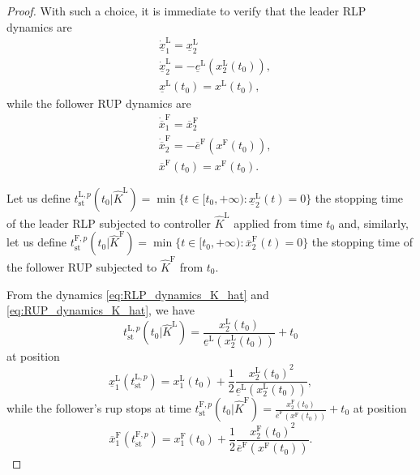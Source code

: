 \documentclass[letterpaper, 10 pt, conference]{ieeeconf}
\theoremstyle{definition}
\theoremstyle{nopoint}
\begin{document}
\begin{proof}
	With such a choice, it is immediate to verify that the  
	leader RLP dynamics are
	\begin{subequations}\label{eq:RLP_dynamics_K_hat}
		\begin{align}
			& \dot{\underline{x}}_1^\mathrm{L}=\underline{x}_2^\mathrm{L} \label{eq:RLP_dynamics_K_hat_dynamics}\\
			& \dot{\underline{x}}_2^\mathrm{L}=-\underline{e}^\mathrm{L}\left(x_2^\mathrm{L}(t_0)\right),\label{eq:RLP_dynamics_K_hat_constraints}\\
			& \underline{x}^\mathrm{L}(t_0)=x^\mathrm{L}(t_0), \label{eq:RLP_dynamics_K_hat_initial}
		\end{align}
	\end{subequations}
	while the follower RUP dynamics are
	\begin{subequations}\label{eq:RUP_dynamics_K_hat}
		\begin{align}
			& \dot{\overline{x}}_1^\mathrm{F}=\overline{x}_2^\mathrm{F} \label{eq:RUP_dynamics_K_hat_dynamics}\\
			& \dot{\overline{x}}_2^\mathrm{F}=-\overline{e}^\mathrm{F}\left(x^\mathrm{F}(t_0)\right),\label{eq:RUP_dynamics_K_hat_constraints}\\
			& \overline{x}^\mathrm{F}(t_0)=x^\mathrm{F}(t_0).
			\label{eq:RUP_dynamics_K_hat_initial}
		\end{align}
	\end{subequations}
	
	Let us define $t_{\mathrm{st}}^{\mathrm{L},p}(t_0 |\hat{K}^\mathrm{L})= \min\{t\in[t_0, +\infty): \underline{x}_2^\mathrm{L}(t)=0\}$ the stopping time of the leader RLP subjected to controller $\hat{K}^\mathrm{L}$ applied from time $t_0$ and, similarly, let us define $t_{\mathrm{st}}^{\mathrm{F},p}(t_0 |\hat{K}^\mathrm{F})= \min\{t\in[t_0, +\infty): \overline{x}_2^\mathrm{F}(t)=0\}$ the stopping time of the follower RUP subjected to $\hat{K}^\mathrm{F}$ from $t_0$. 
	
	
	From the dynamics  \eqref{eq:RLP_dynamics_K_hat} and \eqref{eq:RUP_dynamics_K_hat}, we have 
	\begin{equation}\label{eq:t_stop_L_P}
		t_{\mathrm{st}}^{\mathrm{L},p}(t_0 |\hat{K}^\mathrm{L}) = \frac{x_2^\mathrm{L}(t_0)}{\underline{e}^\mathrm{L}\left(x_2^\mathrm{L}(t_0)\right)} + t_0
	\end{equation}
	at position
	\begin{equation}\label{eq:leader_RLP_stop_position}
		\underline{x}_1^\mathrm{L}(t_{\mathrm{st}}^{\mathrm{L},p} )=x_1^\mathrm{L}(t_0)+\frac{1}{2} \frac{{x_2^\mathrm{L}(t_0)}^2}{\underline{e}^\mathrm{L}\left(x_2^\mathrm{L}(t_0)\right)},
	\end{equation}
	while the follower's \gls{rup} stops at time $t_{\mathrm{st}}^{\mathrm{F},p}(t_0 |\hat{K}^\mathrm{F})= \frac{x_2^\mathrm{F}(t_0)}{\overline{e}^\mathrm{F}\left(x^\mathrm{F}(t_0)\right)} + t_0$ at position
	\begin{equation}\label{eq:follower_RUP_stop_position}
		\overline{x}_1^\mathrm{F}(t_{\mathrm{st}}^{\mathrm{F},p} )=x_1^\mathrm{F}(t_0)+\frac{1}{2} \frac{{x_2^\mathrm{F}(t_0)}^2}{\overline{e}^\mathrm{F}\left(x^\mathrm{F}(t_0)\right)}.
	\end{equation}
	

\end{proof}
\end{document}
